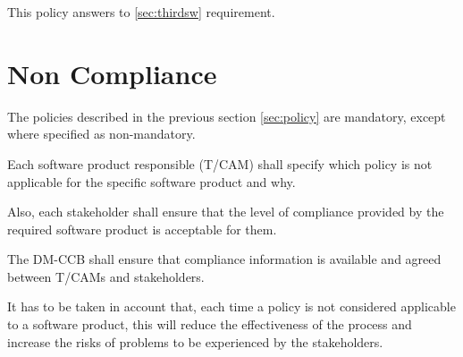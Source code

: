 This policy answers to \ref{sec:thirdsw} requirement.


\newpage
\section{Non Compliance} \label{sec:noncompliance}

The policies described in the previous section \ref{sec:policy} are mandatory, except where specified as non-mandatory.

Each software product responsible (T/CAM) shall specify which policy is not applicable for the specific software product and why.

Also, each stakeholder shall ensure that the level of compliance provided by the required software product is acceptable for them.

The DM-CCB shall ensure that compliance information is available and agreed between T/CAMs and stakeholders.

It has to be taken in account that, each time a policy is not considered applicable to a software product, this will reduce the effectiveness of the process and increase the risks of problems to be experienced by the stakeholders.
